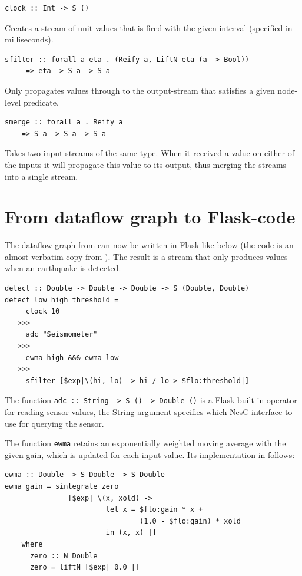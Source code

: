 \documentclass[a4paper, oneside, final]{memoir}
\let\fref\undefined
\begin{document}
\begin{description}
\item
\begin{verbatim}
clock :: Int -> S ()
\end{verbatim}
  Creates a stream of unit-values
  that is fired with the given interval (specified in milliseconds).

\item
\begin{verbatim}
sfilter :: forall a eta . (Reify a, LiftN eta (a -> Bool))
     => eta -> S a -> S a
\end{verbatim}
  Only propagates values through to the
  output-stream that satisfies a given node-level predicate.
  
\item
\begin{verbatim}
smerge :: forall a . Reify a
    => S a -> S a -> S a
\end{verbatim}
Takes two input streams of the same type. When it received a value on
either of the inputs it will propagate this value to its output, thus
merging the streams into a single stream.

\end{description}
\newpage
\section{From dataflow graph to Flask-code}
The dataflow graph from \fref{fig:ewma-example} can now be written
in Flask like below (the code is an almost verbatim copy from
\cite{flask08}). The result is a stream that only produces values when
an earthquake is detected.
\begin{verbatim}
detect :: Double -> Double -> Double -> S (Double, Double)
detect low high threshold = 
     clock 10
   >>>
     adc "Seismometer"
   >>>
     ewma high &&& ewma low
   >>>
     sfilter [$exp|\(hi, lo) -> hi / lo > $flo:threshold|]
\end{verbatim}

\noindent
The function \verb#adc :: String -> S () -> Double ()# is a Flask
built-in operator for reading sensor-values, the String-argument
specifies which NesC interface to use for querying the sensor.

The function \texttt{ewma} retains an exponentially weighted moving
average with the given gain, which is updated for each input
value. Its implementation in \cite{flask08} follows:

\begin{verbatim}
ewma :: Double -> S Double -> S Double
ewma gain = sintegrate zero
               [$exp| \(x, xold) ->
                        let x = $flo:gain * x +
                                (1.0 - $flo:gain) * xold
                        in (x, x) |]
    where
      zero :: N Double
      zero = liftN [$exp| 0.0 |]
\end{verbatim}
\end{document}
